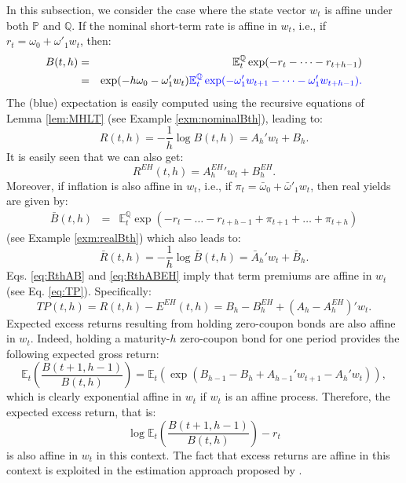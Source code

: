 \documentclass[
  12pt,
]{book}
\theoremstyle{definition}
\theoremstyle{definition}
\theoremstyle{definition}
\theoremstyle{definition}
\theoremstyle{remark}
\begin{document}
In this subsection, we consider the case where the state vector \(w_t\) is affine under both \(\mathbb{P}\) and \(\mathbb{Q}\). If the nominal short-term rate is affine in \(w_t\), i.e., if \(r_t = \omega_0 + \omega'_1 w_t\), then:
\begin{eqnarray*}
B(t,h) &=& \mathbb{E}^{\mathbb{Q}}_t \exp (-r_{t}-\dots-r_{t+h-1})\\
&=& \exp(-h\omega_0 - \omega'_1 w_t) \color{blue}{\mathbb{E}^{\mathbb{Q}}_t \exp (- \omega'_1 w_{t+1}-\dots- \omega'_1 w_{t+h-1})}.
\end{eqnarray*}
The (blue) expectation is easily computed using the recursive equations of Lemma \ref{lem:MHLT} (see Example \ref{exm:nominalBth}), leading to:
\begin{equation}
R(t,h)= -  \frac{1}{h}   \log   B(t,h) = A_h'w_t + B_h.\label{eq:RthAB}
\end{equation}
It is easily seen that we can also get:
\begin{equation}
R^{EH}(t,h) = {A^{EH}_h}'w_t + B^{EH}_h.\label{eq:RthABEH}
\end{equation}
Moreover, if inflation is also affine in \(w_t\), i.e., if \(\pi_{t} = \bar\omega_0 + \bar\omega'_1 w_t\), then real yields are given by:
\begin{eqnarray*}
\bar{B}(t,h) &=& \mathbb{E}^{\mathbb{Q}}_t \exp(-r_{t}-\dots-r_{t+h-1}+\pi_{t+1}+\dots+\pi_{t+h})
\end{eqnarray*}
(see Example \ref{exm:realBth}) which also leads to:
\begin{equation}
\bar{R}(t,h) = -  \frac{1}{h}   \log   \bar{B}(t,h) = \bar{A}_h'w_t + \bar{B}_h.\label{eq:RbarthAB}
\end{equation}
Eqs. \eqref{eq:RthAB} and \eqref{eq:RthABEH} imply that term premiums are affine in \(w_t\) (see Eq. \eqref{eq:TP}). Specifically:
\[
TP(t,h) = R(t,h) - E^{EH}(t,h) = B_h - B_h^{EH} + (A_h - A_h^{EH})'w_t.
\]
Expected excess returns resulting from holding zero-coupon bonds are also affine in \(w_t\). Indeed, holding a maturity-\(h\) zero-coupon bond for one period provides the following expected gross return:
\[
\mathbb{E}_t\left(\frac{B(t+1,h-1)}{B(t,h)}\right) = \mathbb{E}_t\left(\exp(B_{h-1} - B_h + A_{h-1}'w_{t+1} - A_h'w_{t})\right),
\]
which is clearly exponential affine in \(w_t\) if \(w_t\) is an affine process. Therefore, the expected excess return, that is:
\[
\log \mathbb{E}_t\left(\frac{B(t+1,h-1)}{B(t,h)}\right) - r_t
\]
is also affine in \(w_t\) in this context. The fact that excess returns are affine in this context is exploited in the estimation approach proposed by \citet{Adrian_Crump_Moench_2013}.
\end{document}

